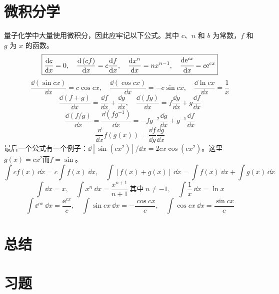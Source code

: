 	\section{微积分学}
	\label{sec:1.8 Calculus}
	量子化学中大量使用微积分，因此应牢记以下公式。其中 $c$、$n$ 和 $b$ 为常数，$f$ 和 $g$ 为 $x$ 的函数。
	\begin{equation*}
		\boxed{
			\frac{\dd c}{\dd x} = 0, \quad \frac{\dd \left(cf\right)}{\dd x} = c\frac{\dd f}{\dd x}, \quad \frac{\dd x^n}{\dd x} = nx^{n-1}, \quad \cfrac{\dd \mathrm{e}^{cx}}{\dd x} = c\mathrm{e}^{cx}
		}
	\end{equation*}
	\begin{equation*}
		\boxed{
			\frac{\dd \left(\sin cx\right)}{\dd x} = c \cos cx, \quad \frac{\dd \left(\cos cx\right)}{\dd x} = -c \sin cx, \quad \frac{\dd \ln cx}{\dd x } = \frac{1}{x}
		}
	\end{equation*}
	\begin{equation*}
		\boxed{
			\frac{\dd \left(f+g\right)}{\dd x} = \frac{\dd f}{\dd x}+\frac{\dd g}{\dd x}, \quad \frac{\dd \left(fg\right)}{\dd x} = f\frac{\dd g}{\dd x}+g\frac{\dd f}{\dd x}
		}
	\end{equation*}
	\begin{equation*}
		\boxed{
			\frac{\dd \left(f/g\right)}{\dd x} = \frac{\dd \left(fg^{-1}\right)}{\dd x} = -fg^{-2}\frac{\dd g}{\dd x}+g^{-1}\frac{\dd f}{\dd x}
		}
	\end{equation*}
	\begin{equation*}
		\boxed{
			\frac{\dd }{\dd x}f\left(g\left(x\right)\right) = \frac{\dd f}{\dd g}\frac{\dd g}{\dd x}
		}
	\end{equation*}
	最后一个公式有一个例子：$\dd \left[\sin\left(cx^2\right)\right]/\dd x = 2cx\cos\left(cx^2\right)$。这里$g\left(x\right) = cx^2$而$f=\sin$。
	\begin{equation*}
		\boxed{
			\int cf\left(x\right)\:\dd x = c \int f\left(x\right)\:\dd x, \quad \int \left[f\left(x\right)+g\left(x\right)\right]\:\dd x = \int f\left(x\right)\:\dd x+\int g\left(x\right)\:\dd x
		}
	\end{equation*}
	\begin{equation*}
		\boxed{
			\int \dd x = x, \quad \int x^n\:\dd x = \frac{x^{n+1}}{n+1} \: \text{其中} \: n \neq -1, \quad \int \frac{1}{x}\:\dd x = \ln x
		}
	\end{equation*}
	\begin{equation*}
		\boxed{
			\int \ee^{cx}\:\dd x = \frac{\ee^{cx}}{c}, \quad \int \sin cx\:\dd x = -\frac{\cos cx}{c}, \quad \int \cos cx\:\dd x = \frac{\sin cx}{c}
		}
	\end{equation*}
	
\section*{总结}

\section*{习题}
